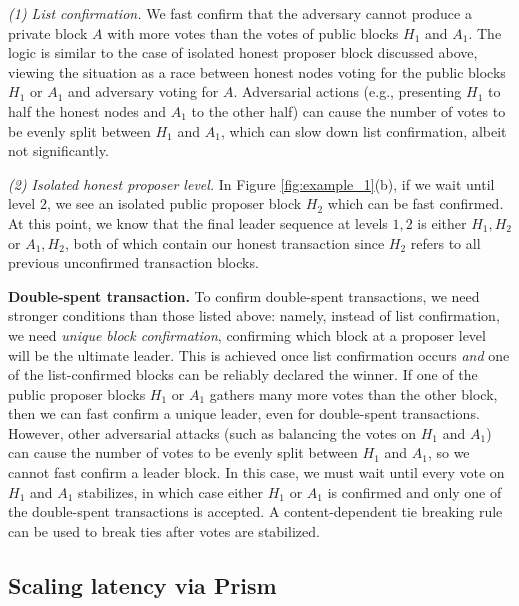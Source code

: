 \documentclass{article}
\begin{document}
\textit{(1) List confirmation.} We fast confirm that the adversary cannot produce a private block $A$ with more votes than the votes of public blocks $H_1$ and $A_1$. 
The logic is similar to the case of isolated honest proposer block discussed above, viewing the situation as a race between honest nodes voting for the public blocks $H_1$ or $A_1$ and adversary voting for $A$. 
Adversarial actions (e.g., presenting $H_1$ to half the honest nodes and $A_1$ to the other half) can cause the number of votes to be evenly split between $H_1$ and $A_1$, which can slow down list confirmation, albeit not significantly.

\textit{(2) Isolated honest proposer level.}
In Figure \ref{fig:example_1}(b), if we wait until level $2$, we see an isolated public proposer block $H_2$ which can be fast confirmed. 
At this point, we know that the final leader sequence at levels $1,2$ is either $H_1,H_2$ or $A_1,H_2$, both of which contain our honest transaction since $H_2$ refers to all previous unconfirmed transaction blocks. 


\noindent \textbf{Double-spent transaction.}
To confirm double-spent transactions, we need stronger conditions than those listed above: namely, instead of list confirmation, we need \emph{unique block confirmation}, confirming which block at a proposer level will be the ultimate leader.
This is achieved once list confirmation occurs \emph{and} one of the list-confirmed blocks can be reliably declared the winner. 
If one of the public proposer blocks $H_1$ or $A_1$ gathers many more votes than the other block, then we can fast confirm a unique leader, even for double-spent transactions.
However, other adversarial attacks (such as balancing the votes on $H_1$ and $A_1$) can cause the number of votes to be evenly split between $H_1$ and $A_1$, so we cannot fast confirm a leader block.
In this case, we must wait until every vote on $H_1$ and $A_1$ stabilizes, in which case either $H_1$ or $A_1$ is confirmed and only one of the double-spent transactions is accepted. 
A content-dependent tie breaking rule can be used to break ties after votes are stabilized.



\subsection*{Scaling latency via Prism}  
\end{document}
